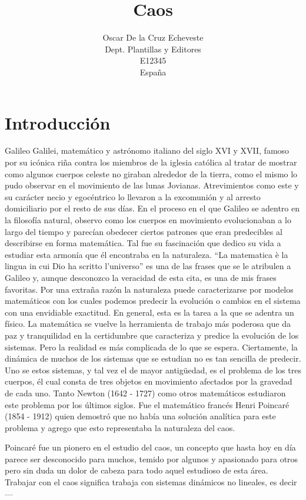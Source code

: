 \documentclass[11pt,twocolumn,spanish]{article}
\title{Caos}
\author{Oscar De la Cruz Echeveste\\
  \small Dept. Plantillas y Editores\\
  \small E12345\\
  \small España
}
\theoremstyle{definition}
\theoremstyle{remark}
\begin{document}
\maketitle


\section{Introducción}

Galileo Galilei, matemático y astrónomo italiano del siglo XVI y XVII, famoso por su icónica riña contra los miembros de la iglesia católica al tratar de mostrar como algunos cuerpos celeste no giraban alrededor de la tierra, como el mismo lo pudo observar en el movimiento de las lunas Jovianas. Atrevimientos como este y su carácter necio y egocéntrico lo llevaron a la excomunión y al arresto domiciliario por el resto de sus días. En el proceso en el que Galileo se adentro en la filosofía natural, observo como los cuerpos en movimiento evolucionaban a lo largo del tiempo y parecían obedecer ciertos patrones que eran predecibles al describirse en forma matemática. Tal fue su fascinación que dedico su vida a estudiar esta armonía que él encontraba en la naturaleza. “La matematica è la lingua in cui Dio ha scritto l'universo” es una de las frases que se le atribulen a Galileo y, aunque desconozco la veracidad de esta cita, es una de mis frases favoritas. Por una extraña razón la naturaleza puede caracterizarse por modelos matemáticos con los cuales podemos predecir la evolución o cambios en el sistema con una envidiable exactitud. En general, esta es la tarea a la que se adentra un físico. La matemática se vuelve la herramienta de trabajo más poderosa que da paz y tranquilidad en la certidumbre que caracteriza y predice la evolución de los sistemas. Pero la realidad es más complicada de lo que se espera. Ciertamente, la dinámica de muchos de los sistemas que se estudian no es tan sencilla de predecir. Uno se estos sistemas, y tal vez el de mayor antigüedad, es el problema de los tres cuerpos, él cual consta de tres objetos en movimiento afectados por la gravedad de cada uno. Tanto Newton (1642 - 1727) como otros matemáticos estudiaron este problema por los últimos siglos. Fue el matemático francés Henri Poincaré (1854 - 1912) quien demostró que no había una solución analítica para este problema y agrego que esto representaba la naturaleza del caos. 

Poincaré fue un pionero en el estudio del caos, un concepto que hasta hoy en día parece ser desconocido para muchos, temido por algunos y apasionado para otros pero sin duda un dolor de cabeza para todo aquel estudioso de esta área. Trabajar con el caos significa trabaja con sistemas dinámicos no lineales, es decir — 
\end{document}
